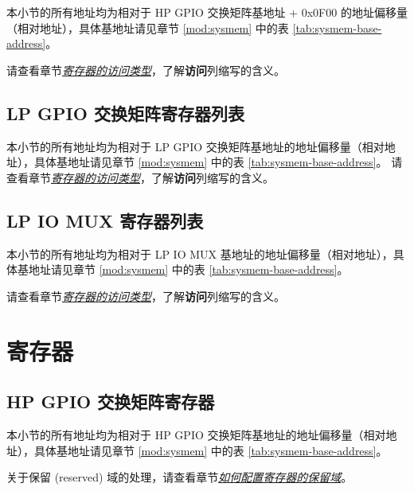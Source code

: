 \documentclass[main\_\_CN.tex]{subfiles}
\begin{document}
本小节的所有地址均为相对于 HP GPIO 交换矩阵基地址 + 0x0F00 的地址偏移量（相对地址），具体基地址请见章节 \ref{mod:sysmem} \textit{} 中的表 \ref{tab:sysmem-base-address}。

请查看章节\hyperref[glossary-access-types]{\textit{寄存器的访问类型}}，了解\textbf{访问}列缩写的含义。



\subsection{LP GPIO 交换矩阵寄存器列表}
\label{sec:lp-gpio-register-summ}

本小节的所有地址均为相对于 LP GPIO 交换矩阵基地址的地址偏移量（相对地址），具体基地址请见章节 \ref{mod:sysmem} \textit{} 中的表 \ref{tab:sysmem-base-address}。
请查看章节\hyperref[glossary-access-types]{\textit{寄存器的访问类型}}，了解\textbf{访问}列缩写的含义。



\subsection{LP IO MUX 寄存器列表}
\label{sec:lp-iomux-register-summ}

本小节的所有地址均为相对于 LP IO MUX 基地址的地址偏移量（相对地址），具体基地址请见章节 \ref{mod:sysmem} \textit{} 中的表 \ref{tab:sysmem-base-address}。

请查看章节\hyperref[glossary-access-types]{\textit{寄存器的访问类型}}，了解\textbf{访问}列缩写的含义。



\section{寄存器}

\subsection{HP GPIO 交换矩阵寄存器}
本小节的所有地址均为相对于 HP GPIO 交换矩阵基地址的地址偏移量（相对地址），具体基地址请见章节 \ref{mod:sysmem} \textit{} 中的表 \ref{tab:sysmem-base-address}。

关于保留 (reserved) 域的处理，请查看章节\hyperref[programming-reserved-field]{\textit{如何配置寄存器的保留域}}。
\end{document}
